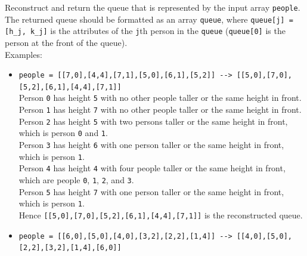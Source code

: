 Reconstruct and return the queue that is represented by the input array {\colorbox{CodeBackground}{\lstinline|people|}}. \\

The returned queue should be formatted as an array {\colorbox{CodeBackground}{\lstinline|queue|}}, where {\colorbox{CodeBackground}{\lstinline|queue[j] = [h_j, k_j]|}} is the attributes of the {\colorbox{CodeBackground}{\lstinline|j|}}th person in the {\colorbox{CodeBackground}{\lstinline|queue|}} ({\colorbox{CodeBackground}{\lstinline|queue[0]|}} is the person at the front of the queue).\\

Examples:
\begin{itemize}
\item {\colorbox{CodeBackground}{\lstinline|people = [[7,0],[4,4],[7,1],[5,0],[6,1],[5,2]] --> [[5,0],[7,0],[5,2],[6,1],[4,4],[7,1]]|}}\\
Person {\colorbox{CodeBackground}{\lstinline|0|}} has height {\colorbox{CodeBackground}{\lstinline|5|}} with no other people taller or the same height in front.\\
Person {\colorbox{CodeBackground}{\lstinline|1|}} has height {\colorbox{CodeBackground}{\lstinline|7|}} with no other people taller or the same height in front.\\
Person {\colorbox{CodeBackground}{\lstinline|2|}} has height {\colorbox{CodeBackground}{\lstinline|5|}} with two persons taller or the same height in front, which is person {\colorbox{CodeBackground}{\lstinline|0|}} and {\colorbox{CodeBackground}{\lstinline|1|}}.\\
Person {\colorbox{CodeBackground}{\lstinline|3|}} has height {\colorbox{CodeBackground}{\lstinline|6|}} with one person taller or the same height in front, which is person {\colorbox{CodeBackground}{\lstinline|1|}}.\\
Person {\colorbox{CodeBackground}{\lstinline|4|}} has height {\colorbox{CodeBackground}{\lstinline|4|}} with four people taller or the same height in front, which are people {\colorbox{CodeBackground}{\lstinline|0|}}, {\colorbox{CodeBackground}{\lstinline|1|}}, {\colorbox{CodeBackground}{\lstinline|2|}}, and {\colorbox{CodeBackground}{\lstinline|3|}}.\\
Person {\colorbox{CodeBackground}{\lstinline|5|}} has height {\colorbox{CodeBackground}{\lstinline|7|}} with one person taller or the same height in front, which is person {\colorbox{CodeBackground}{\lstinline|1|}}.\\
Hence {\colorbox{CodeBackground}{\lstinline|[[5,0],[7,0],[5,2],[6,1],[4,4],[7,1]]|}} is the reconstructed queue.
\item {\colorbox{CodeBackground}{\lstinline|people = [[6,0],[5,0],[4,0],[3,2],[2,2],[1,4]] --> [[4,0],[5,0],[2,2],[3,2],[1,4],[6,0]]|}}\\
\end{itemize}

